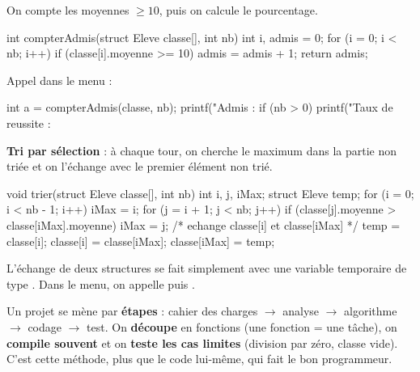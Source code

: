 On compte les moyennes $\geq 10$, puis on calcule le pourcentage.
\begin{codec}
int compterAdmis(struct Eleve classe[], int nb) {
    int i, admis = 0;
    for (i = 0; i < nb; i++) {
        if (classe[i].moyenne >= 10) {
            admis = admis + 1;
        }
    }
    return admis;
}
\end{codec}
Appel dans le menu :
\begin{codec}
int a = compterAdmis(classe, nb);
printf("Admis : %
if (nb > 0) {
    printf("Taux de reussite : %
}
\end{codec}

\textbf{Tri par sélection} : à chaque tour, on cherche le maximum dans la partie non
triée et on l'échange avec le premier élément non trié.
\begin{codec}
void trier(struct Eleve classe[], int nb) {
    int i, j, iMax;
    struct Eleve temp;
    for (i = 0; i < nb - 1; i++) {
        iMax = i;
        for (j = i + 1; j < nb; j++) {
            if (classe[j].moyenne > classe[iMax].moyenne) {
                iMax = j;
            }
        }
        /* echange classe[i] et classe[iMax] */
        temp = classe[i];
        classe[i] = classe[iMax];
        classe[iMax] = temp;
    }
}
\end{codec}
L'échange de deux structures se fait simplement avec une variable temporaire
 de type . Dans le menu, on appelle  puis
.

\begin{aretenir}
Un projet se mène par \textbf{étapes} : cahier des charges $\to$ analyse $\to$
algorithme $\to$ codage $\to$ test. On \textbf{découpe} en fonctions (une fonction
= une tâche), on \textbf{compile souvent} et on \textbf{teste les cas limites}
(division par zéro, classe vide). C'est cette méthode, plus que le code lui-même,
qui fait le bon programmeur.
\end{aretenir}
